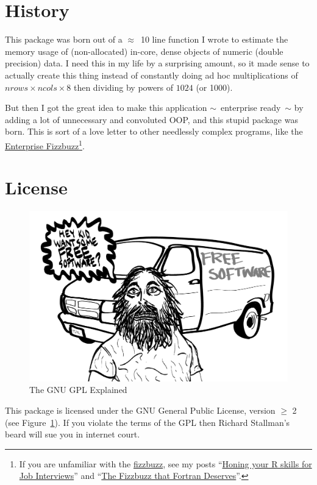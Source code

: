 \section{History}

This package was born out of a $\approx$~10 line function I wrote to estimate the memory usage of (non-allocated) in-core, dense  objects of numeric (double precision) data.  I need this in my life by a surprising amount, so it made sense to actually create this thing instead of constantly doing ad hoc multiplications of $nrows\times ncols \times 8$ then dividing by powers of $1024$ (or 1000).

But then I got the great idea to make this application $\sim$~\hspace{-.1cm}enterprise ready\hspace{-.1cm}~$\sim$ by adding a lot of unnecessary and convoluted OOP, and this stupid package was born.  This is sort of a love letter to other needlessly complex programs, like the \href{https://github.com/Mikkeren/FizzBuzzEnterpriseEdition}{Enterprise Fizzbuzz}\footnote{If you are unfamiliar with the \href{https://en.wikipedia.org/wiki/Bizz_buzz}{fizzbuzz}, see my posts ``\href{http://librestats.com/2012/01/10/honing-your-r-skills-for-job-interviews/}{Honing your R skills for Job Interviews}'' and ``\href{http://librestats.com/2013/04/26/the-fizzbuzz-that-fortran-deserves/}{The Fizzbuzz that Fortran Deserves}''.}.



\section{License}

\begin{figure}[th]
  \centering
  \includegraphics[scale=.35]{./include/gpl.png}
  \caption{The GNU GPL Explained}
  \label{fig:gnu}
\end{figure}
This package is licensed under the GNU General Public License, version $\geq$ 2 (see Figure~\ref{fig:gnu}).
If you violate the terms of the GPL then Richard Stallman's beard will sue you in internet court.



